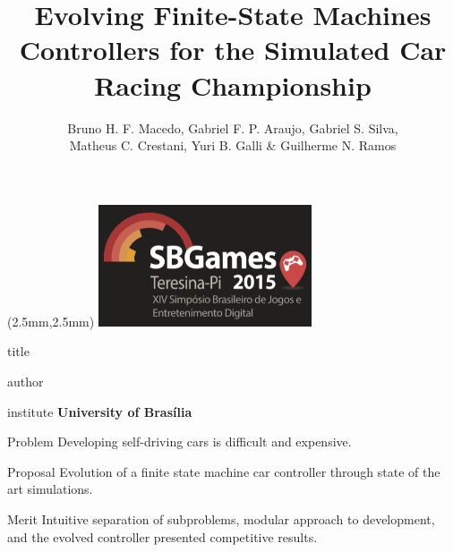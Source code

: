\documentclass{UnBeamer}%
\title[FSMDriver]{Evolving Finite-State Machines Controllers for the Simulated Car Racing Championship}
\author{Bruno H. F. Macedo, Gabriel F. P. Araujo, Gabriel S. Silva,\\Matheus C. Crestani, Yuri B. Galli \& Guilherme N. Ramos}%
\begin{document}
\begin{frame}%
	\begin{textblock*}{63mm}(2.5mm,2.5mm)
	\includegraphics[height=36mm,width=63mm]{img/beamer/SBGames-logo-dark}%
	\end{textblock*}
	\vspace*{40mm}
	\begin{beamercolorbox}[sep=8pt,center]{title}%
        \Huge\inserttitle\par%
    \end{beamercolorbox}%
    \begin{beamercolorbox}[sep=8pt,center]{author}%
        \insertauthor%
    \end{beamercolorbox}%
    \begin{beamercolorbox}[sep=8pt,center]{institute}%
        \textbf{University of Bras\'{i}lia}%
    \end{beamercolorbox}%
\end{frame}%

\begin{frame}%
	\begin{alertblock}{Problem}%
		Developing self-driving cars is difficult and expensive.
	\end{alertblock}%
	\vfill\pause%
	\begin{block}{Proposal}%
		Evolution of a finite state machine car controller through state of the art simulations.
	\end{block}%
	\vfill\pause%
	\begin{exampleblock}{Merit}%
	Intuitive separation of subproblems, modular approach to development, and the evolved controller presented competitive results.
	\end{exampleblock}%
\end{frame}%

\end{document}
